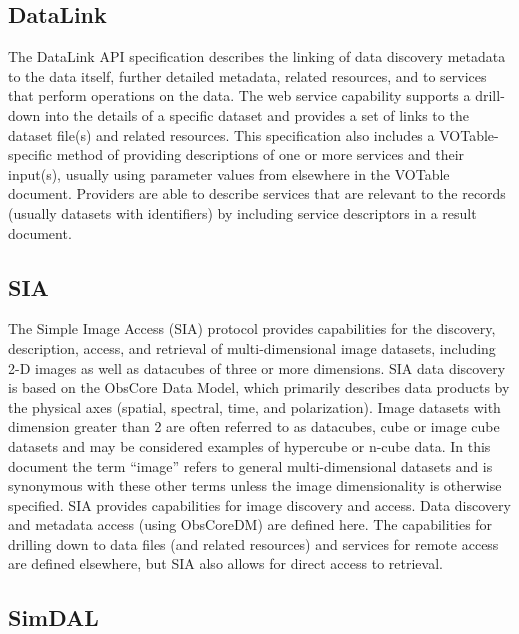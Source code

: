 \documentclass[11pt,letter]{ivoa}
\begin{document}
\subsection{DataLink}

The DataLink \citep{2023ivoa.spec.1215B} API specification describes the linking of data discovery metadata to  
the data itself, further detailed metadata, related resources, and to services that perform 
operations on the data. The web service capability supports a drill-down into the details 
of a specific dataset and provides a set of links to the dataset file(s) and related resources. 
This specification also includes a VOTable-specific method of providing descriptions of one 
or more services and their input(s), usually using parameter values from elsewhere in the 
VOTable document. Providers are able to describe services that are relevant to the records 
(usually datasets with identifiers) by including service descriptors in a result document. 

\subsection{SIA}

The Simple Image Access (SIA) \citep{2015ivoa.spec.1223D} protocol provides capabilities for the discovery, description, 
access, and retrieval of multi-dimensional image datasets, including 2-D images as well 
as datacubes of three or more dimensions. SIA data discovery is based on the ObsCore Data 
Model, which primarily describes data products by the physical axes (spatial, spectral, 
time, and polarization). Image datasets with dimension greater than 2 are often referred 
to as datacubes, cube or image cube datasets and may be considered examples of hypercube 
or n-cube data. In this document the term ``image'' refers to general multi-dimensional 
datasets and is synonymous with these other terms unless the image dimensionality is 
otherwise specified. SIA provides capabilities for image discovery and access. Data 
discovery and metadata access (using ObsCoreDM) are defined here. The capabilities for 
drilling down to data files (and related resources) and services for remote access are 
defined elsewhere, but SIA also allows for direct access to retrieval. 

\subsection{SimDAL}
\end{document}
